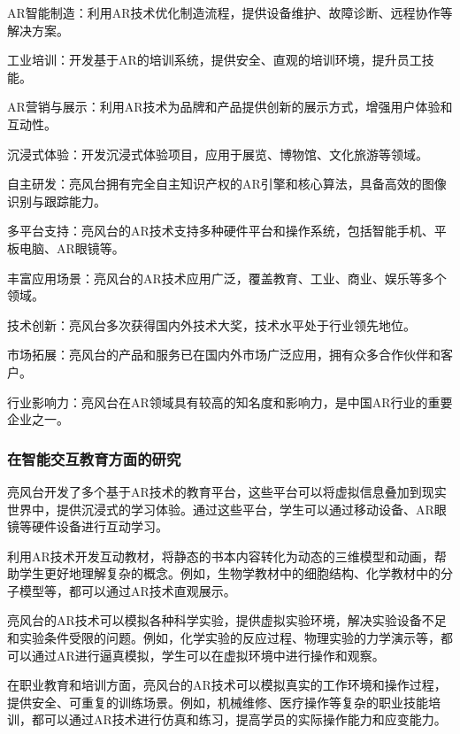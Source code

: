 
AR智能制造：利用AR技术优化制造流程，提供设备维护、故障诊断、远程协作等解决方案。

工业培训：开发基于AR的培训系统，提供安全、直观的培训环境，提升员工技能。


AR营销与展示：利用AR技术为品牌和产品提供创新的展示方式，增强用户体验和互动性。

沉浸式体验：开发沉浸式体验项目，应用于展览、博物馆、文化旅游等领域。


自主研发：亮风台拥有完全自主知识产权的AR引擎和核心算法，具备高效的图像识别与跟踪能力。

多平台支持：亮风台的AR技术支持多种硬件平台和操作系统，包括智能手机、平板电脑、AR眼镜等。

丰富应用场景：亮风台的AR技术应用广泛，覆盖教育、工业、商业、娱乐等多个领域。


技术创新：亮风台多次获得国内外技术大奖，技术水平处于行业领先地位。

市场拓展：亮风台的产品和服务已在国内外市场广泛应用，拥有众多合作伙伴和客户。

行业影响力：亮风台在AR领域具有较高的知名度和影响力，是中国AR行业的重要企业之一。

\subsubsection{在智能交互教育方面的研究}


亮风台开发了多个基于AR技术的教育平台，这些平台可以将虚拟信息叠加到现实世界中，提供沉浸式的学习体验。通过这些平台，学生可以通过移动设备、AR眼镜等硬件设备进行互动学习。

利用AR技术开发互动教材，将静态的书本内容转化为动态的三维模型和动画，帮助学生更好地理解复杂的概念。例如，生物学教材中的细胞结构、化学教材中的分子模型等，都可以通过AR技术直观展示。

亮风台的AR技术可以模拟各种科学实验，提供虚拟实验环境，解决实验设备不足和实验条件受限的问题。例如，化学实验的反应过程、物理实验的力学演示等，都可以通过AR进行逼真模拟，学生可以在虚拟环境中进行操作和观察。

在职业教育和培训方面，亮风台的AR技术可以模拟真实的工作环境和操作过程，提供安全、可重复的训练场景。例如，机械维修、医疗操作等复杂的职业技能培训，都可以通过AR技术进行仿真和练习，提高学员的实际操作能力和应变能力。

